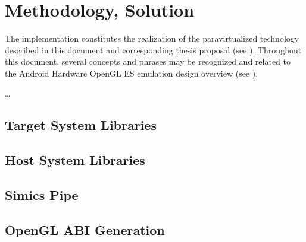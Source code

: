 
\chapter{Methodology, Solution}
\label{cha:methodologysolution}
The implementation constitutes the realization of the paravirtualized technology described in this document and corresponding thesis proposal (see ).
Throughout this document, several concepts and phrases may be recognized and related to the Android Hardware OpenGL ES emulation design overview (see ).

\ldots


\section{Target System Libraries}
\label{cha:methodologysolution_targetsystemlibraries}

\section{Host System Libraries}
\label{cha:methodologysolution_hostsystemlibraries}

\section{Simics Pipe}
\label{cha:methodologysolution_simicspipe}

\section{OpenGL ABI Generation}
\label{cha:methodologysolution_openglabigeneration}

